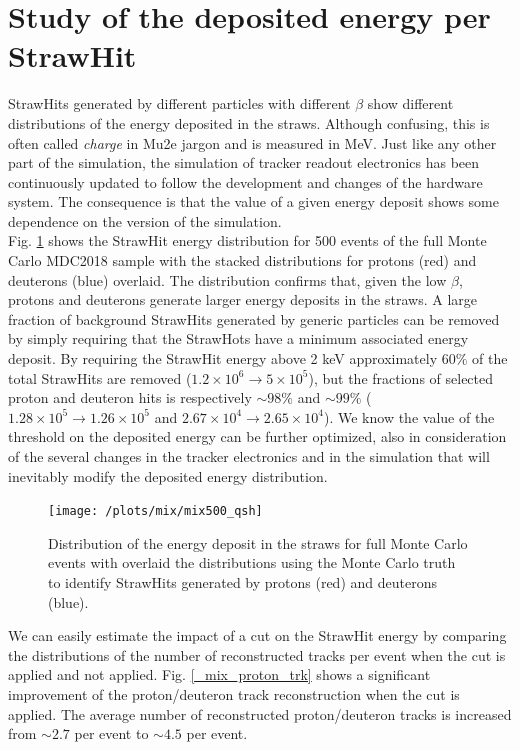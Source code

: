 \documentclass[12pt,a4paper,openright, oneside, titlepage]{book} %
\begin{document}
\section{Study of the deposited energy per StrawHit}
StrawHits generated by different particles with different $\beta$ 
show different distributions of the energy deposited in the straws. 
Although confusing, this is often called \textit{charge} in Mu2e jargon and is measured in MeV.
Just like any other part of the simulation, 
the simulation of tracker readout electronics has been continuously updated
to follow the development and changes of the hardware system.    
The consequence is that the value of a given energy deposit 
shows some dependence on the version of the simulation.\\
Fig. \ref{_mix_proton_qsh} shows the StrawHit energy
distribution for 500 events of the full Monte Carlo MDC2018 sample 
with the stacked distributions for protons (red) and deuterons (blue) overlaid.
The distribution confirms that, given the low $\beta$, protons and deuterons generate 
larger energy deposits in the straws. A large fraction of background StrawHits
generated by generic particles can be removed by simply requiring 
that the StrawHots have a minimum associated energy deposit. 
By requiring the StrawHit energy above 2 keV
approximately $60 \%$ of the total StrawHits are removed 
($1.2 \times 10^6 \rightarrow 5 \times 10^5$), 
but the fractions of selected proton and deuteron hits is 
respectively $\sim 98\%$  and $\sim 99\%$ 
($1.28 \times 10^5 \rightarrow 1.26 \times 10^5$ and $2.67 \times 10^4 \rightarrow 2.65 \times 10^4$).
We know the value of the threshold on the deposited energy can be further optimized, 
also in consideration of the several changes in the tracker electronics 
and in the simulation that will inevitably modify the deposited energy distribution.

\begin{figure}[!htb]
\centering
\texttt{[image: /plots/mix/mix500\_qsh]}
\caption[Distribution of the energy deposited in the tracker straws]
{Distribution of the energy deposit in the straws
for full Monte Carlo events with overlaid the distributions using the Monte Carlo truth 
to identify StrawHits generated by protons (red) and deuterons (blue).}
\label{_mix_proton_qsh}
\end{figure}

\noindent We can easily estimate the impact of a cut on the StrawHit energy 
by comparing the distributions of the number of reconstructed tracks per event 
when the cut is applied and not applied. 
Fig. \ref{_mix_proton_trk} 
shows a significant improvement of the proton/deuteron track reconstruction 
when the cut is applied. 
The average number of reconstructed proton/deuteron tracks 
is increased from $\sim2.7$ per event to $\sim4.5$ per event.
\end{document}
